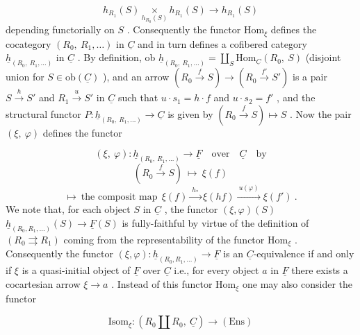 \begin{equation*}
h_{R_1}(S) \underset{h_{R_0}(S)}{\times} h_{R_1}(S) \to h_{R_1}(S)
\end{equation*}
depending functorially on $S$ . Consequently the functor $\mathrm{Hom}_{\xi}$ defines the cocategory $(R_0,\ R_1,\ldots)$ in $\underline{C}$ and in turn defines a cofibered category $\underline{h}_{(R_0,\ R_1,\ldots)}$ in $\underline{C}$ . By definition, ob $\underline{h}_{(R_0,\ R_1,\ldots)} = \coprod_{S} \mathrm{Hom}_{\underline{C}}(R_0,\ S)$ (disjoint union for $S \in \mathrm{ob}(\underline{C})$ ), and an arrow $(R_0 \xrightarrow{f} S) \to (R_0 \xrightarrow{f'} S')$ is a pair $S \xrightarrow{h} S'$ and $R_1 \xrightarrow{u} S'$ in $\underline{C}$ such that $u \cdot s_1 = h \cdot f$ and $u \cdot s_2 = f'$ , and the structural functor $P : \underline{h}_{(R_0,\ R_1,\ldots)} \to \underline{C}$ is given by $(R_0 \xrightarrow{f} S) \longmapsto S$ . Now the pair $(\xi,\ \varphi)$ defines the functor

\begin{equation*}
(\xi,\ \varphi) : \underline{h}_{(R_0,\ R_1,\ldots)} \to \underline{F} \quad \text{over} \quad \underline{C} \quad \text{by}
\end{equation*}
\begin{equation*}
(R_0 \xrightarrow{f} S) \ \longmapsto\ \xi(f)
\end{equation*}
\begin{equation*}
[(R_0 \xrightarrow{f} S) \xrightarrow{\ (h,u)\ } (R_0 \to S')] \longmapsto \ \text{the composit map}\ \ \xi(f) \xrightarrow{\ h_{*}\ } \xi(hf) \xrightarrow{\ u(\varphi)\ } \xi(f') \ .
\end{equation*}
We note that, for each object $S$ in $\underline{C}$ , the functor $(\xi,\varphi)(S)$   $\underline{h}_{(R_0,R_1,\ldots)}(S) \to \underline{F}(S)$ is fully-faithful by virtue of the definition of $(R_0 \rightrightarrows R_1)$ coming from the representability of the functor $\mathrm{Hom}_{\xi}$ . Consequently the functor $(\xi,\varphi) : \underline{h}_{(R_0,R_1,\ldots)} \to \underline{F}$ is an $\underline{C}$-equivalence if and only if $\xi$ is a quasi-initial object of $\underline{F}$ over $\underline{C}$ i.e., for every object $a$ in $\underline{F}$ there exists a cocartesian arrow $\xi \to a$ . Instead of this functor $\mathrm{Hom}_{\xi}$ one may also consider the functor

\begin{equation*}
\mathrm{Isom}_{\xi} : (R_0 \amalg R_0,\ \underline{C}) \to (\mathrm{Ens}) 
\end{equation*}


